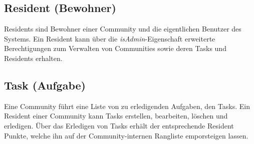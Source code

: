 \subsection*{Resident (Bewohner)}
Residents sind Bewohner einer Community und die eigentlichen Benutzer des Systems. Ein Resident kann über die \emph{isAdmin}-Eigenschaft erweiterte Berechtigungen zum Verwalten von Communities sowie deren Tasks und Residents erhalten.

\subsection*{Task (Aufgabe)}
Eine Community führt eine Liste von zu erledigenden Aufgaben, den Tasks. Ein Resident einer Community kann Tasks erstellen, bearbeiten, löschen und erledigen. Über das Erledigen von Tasks erhält der entsprechende Resident Punkte, welche ihn auf der Community-internen Rangliste emporsteigen lassen.